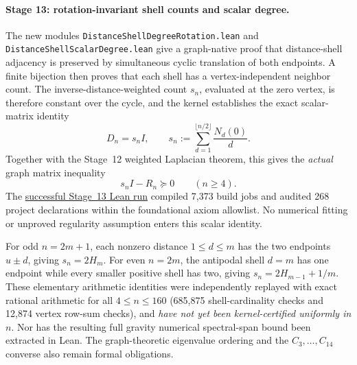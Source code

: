 \paragraph{Stage 13: rotation-invariant shell counts and scalar degree.}
The new modules \texttt{DistanceShellDegreeRotation.lean} and
\texttt{DistanceShellScalarDegree.lean} give a graph-native
proof that distance-shell adjacency is preserved by simultaneous
cyclic translation of both endpoints. A finite bijection then
proves that each shell has a vertex-independent neighbor count.
The inverse-distance-weighted count $s_n$, evaluated at
the zero vertex, is therefore constant over the cycle, and
the kernel establishes the exact scalar-matrix identity
\begin{equation}\label{eq:lean-scalar-degree}
D_n=s_nI,\qquad
s_n:=\sum_{d=1}^{\lfloor n/2\rfloor}
\frac{N_d(0)}d.
\end{equation}
Together with the Stage~12 weighted Laplacian theorem,
this gives the \emph{actual} graph matrix inequality
\begin{equation}\label{eq:lean-scalar-upper}
s_nI-R_n\succeq0 \qquad(n\ge4).
\end{equation}
The \href{https://github.com/tonynewton79-web/newton-400-conjectures/actions/runs/39157366365}{successful Stage~13 Lean run}
compiled 7,373 build jobs and audited 268 project
declarations within the foundational axiom allowlist.
No numerical fitting or unproved regularity assumption enters
this scalar identity.

For odd $n=2m+1$, each nonzero distance $1\le d\le m$
has the two endpoints $u\pm d$, giving $s_n=2H_m$.
For even $n=2m$, the antipodal shell $d=m$ has one
endpoint while every smaller positive shell has two, giving
$s_n=2H_{m-1}+1/m$. These elementary arithmetic
identities were independently replayed with exact rational
arithmetic for all $4\le n\le160$ (685,875 shell-cardinality
checks and 12,874 vertex row-sum checks), and
\emph{have not yet been kernel-certified uniformly in $n$}.
Nor has the resulting full gravity numerical spectral-span
bound been extracted in Lean. The graph-theoretic
eigenvalue ordering and the $C_3,\ldots,C_{14}$ converse
also remain formal obligations.



